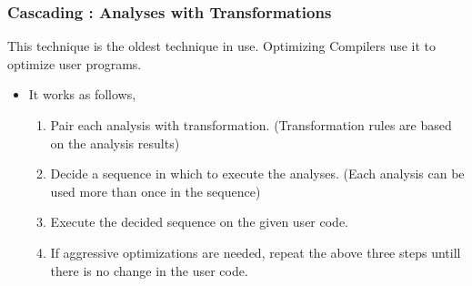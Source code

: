 \begin{frame}
  \frametitle{Cascading : Analyses with Transformations}
    This technique is the oldest technique in use. Optimizing Compilers use it to optimize user programs.
    \begin{itemize}
        \item<2-> It works as follows,

    \begin{enumerate}
    \item<3-> Pair each analysis with transformation. (Transformation rules are based on the analysis results)

    \item<4-> Decide a sequence in which to execute the analyses. (Each analysis can be used more than once in the sequence)

    \item<5-> Execute the decided sequence on the given user code.

    \item<6-> If aggressive optimizations are needed, repeat the above three steps untill there is no change in the user code.
    \end{enumerate}

    \end{itemize}

\end{frame}

